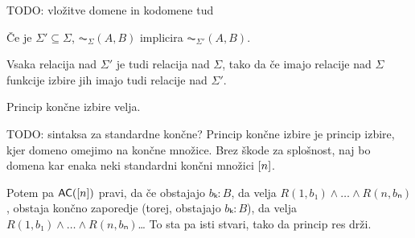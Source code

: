 TODO: vložitve domene in kodomene tud
\begin{trditev}
  Če je \(Σ' ⊆ Σ\), \(\AC_Σ(A, B)\) implicira \(\AC_{Σ'}(A, B)\).
\end{trditev}
\begin{dokaz}
  Vsaka relacija nad \(Σ'\) je tudi relacija nad \(Σ\), tako da če imajo
  relacije nad \(Σ\) funkcije izbire jih imajo tudi relacije nad \(Σ'\).
\end{dokaz}

\begin{trditev}
  Princip končne izbire velja.
\end{trditev}
\begin{dokaz}
  TODO: sintaksa za standardne končne?
  Princip končne izbire je princip izbire, kjer domeno omejimo na končne
  množice. Brez škode za splošnost, naj bo domena kar enaka neki
  standardni končni množici \(\left[ {n} \right]\).

  Potem pa \(\textnormal{\sffamily AC}(\left[ {n} \right])\) pravi, da če
  obstajajo \(bₖ:B\), da velja \(R(1,b₁)∧\dots ∧R(n,bₙ)\), obstaja končno
  zaporedje (torej, obstajajo \(bₖ:B\)), da velja \(R(1,b₁)∧\dots ∧R(n,bₙ)\)… To
  sta pa isti stvari, tako da princip res drži.
\end{dokaz}







